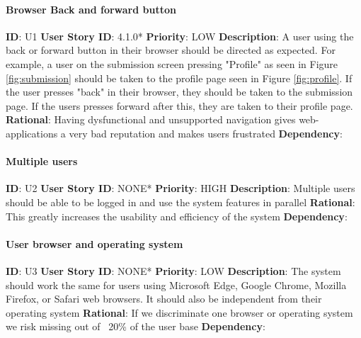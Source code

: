 \documentclass{article}
\begin{document}
\paragraph{Browser Back and forward button}\label{req:}
\textbf{ID}: U1\newline
\textbf{User Story ID}: 4.1.0* \newline
\textbf{Priority}: LOW\newline
\textbf{Description}: A user using the back or forward button in their browser should be directed as expected. For example, a user on the submission screen pressing "Profile" as seen in Figure \ref{fig:submission} should be taken to the profile page seen in Figure \ref{fig:profile}. If the user presses "back" in their browser, they should be taken to the submission page. If the users presses forward after this, they are taken to their profile page.\newline
\textbf{Rational}: Having dysfunctional and unsupported navigation gives web-applications a very bad reputation and makes users frustrated\newline
\textbf{Dependency}: \newline

\paragraph{Multiple users}\label{req:}
\textbf{ID}: U2\newline
\textbf{User Story ID}: NONE* \newline
\textbf{Priority}: HIGH\newline
\textbf{Description}: Multiple users should be able to be logged in and use the system features in parallel\newline
\textbf{Rational}: This greatly increases the usability and efficiency of the system\newline
\textbf{Dependency}: \newline

\paragraph{User browser and operating system}\label{req:}
\textbf{ID}: U3\newline
\textbf{User Story ID}: NONE* \newline
\textbf{Priority}: LOW\newline
\textbf{Description}: The system should work the same for users using Microsoft Edge, Google Chrome, Mozilla Firefox, or Safari web browsers. It should also be independent from their operating system\newline
\textbf{Rational}: If we discriminate one browser or operating system we risk missing out of ~20\% of the user base\newline
\textbf{Dependency}: \newline
\end{document}
